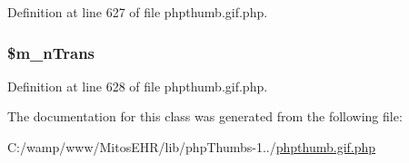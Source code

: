 \-Definition at line 627 of file phpthumb.\-gif.\-php.

\hypertarget{class_c_g_i_f_i_m_a_g_e_a7a1b257d70e45e377ed012c9d972a3c1}{
\subsubsection[{\$m\-\_\-n\-Trans}]{\setlength{\rightskip}{0pt plus 5cm}\$m\-\_\-n\-Trans}}\label{class_c_g_i_f_i_m_a_g_e_a7a1b257d70e45e377ed012c9d972a3c1}


\-Definition at line 628 of file phpthumb.\-gif.\-php.



\-The documentation for this class was generated from the following file\-:\begin{DoxyCompactItemize}
\item 
\-C\-:/wamp/www/\-Mitos\-E\-H\-R/lib/php\-Thumbs-\/1../\hyperlink{phpthumb_8gif_8php}{phpthumb.\-gif.\-php}\end{DoxyCompactItemize}
